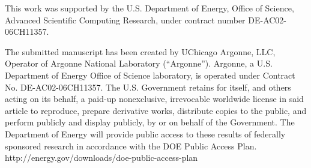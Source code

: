 \documentclass[preprint,12pt]{elsarticle}
\begin{document}
This work was supported by the U.S. Department of Energy, Office of Science, Advanced
Scientific Computing Research, under contract number DE-AC02-06CH11357.

The submitted manuscript has been created by UChicago Argonne, LLC, Operator of
Argonne National Laboratory (“Argonne”). Argonne, a U.S. Department of Energy Office
of Science laboratory, is operated under Contract No. DE-AC02-06CH11357. The U.S.
Government retains for itself, and others acting on its behalf, a paid-up
nonexclusive, irrevocable worldwide license in said article to reproduce, prepare
derivative works, distribute copies to the public, and perform publicly and display
publicly, by or on behalf of the Government. The Department of Energy will provide
public access to these results of federally sponsored research in accordance with the
DOE Public Access Plan. http://energy.gov/downloads/doe-public-access-plan




   
  

%
%
%

\end{document}
